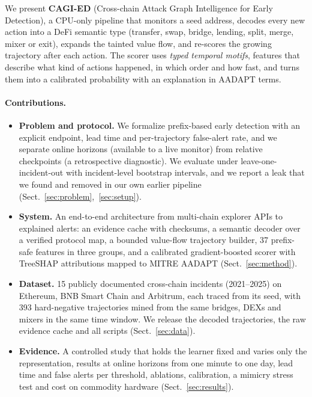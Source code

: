 We present \textbf{CAGI-ED} (Cross-chain Attack Graph Intelligence for Early Detection), a CPU-only pipeline that monitors a seed address, decodes every new action into a DeFi semantic type (transfer, swap, bridge, lending, split, merge, mixer or exit), expands the tainted value flow, and re-scores the growing trajectory after each action.
The scorer uses \emph{typed temporal motifs}, features that describe what kind of actions happened, in which order and how fast, and turns them into a calibrated probability with an explanation in AADAPT terms.

\paragraph{Contributions.}
\begin{itemize}
\item \textbf{Problem and protocol.} We formalize prefix-based early detection with an explicit endpoint, lead time and per-trajectory false-alert rate, and we separate online horizons (available to a live monitor) from relative checkpoints (a retrospective diagnostic). We evaluate under leave-one-incident-out with incident-level bootstrap intervals, and we report a leak that we found and removed in our own earlier pipeline (Sect.~\ref{sec:problem},~\ref{sec:setup}).
\item \textbf{System.} An end-to-end architecture from multi-chain explorer APIs to explained alerts: an evidence cache with checksums, a semantic decoder over a verified protocol map, a bounded value-flow trajectory builder, 37 prefix-safe features in three groups, and a calibrated gradient-boosted scorer with TreeSHAP attributions mapped to MITRE AADAPT (Sect.~\ref{sec:method}).
\item \textbf{Dataset.} 15 publicly documented cross-chain incidents (2021--2025) on Ethereum, BNB Smart Chain and Arbitrum, each traced from its seed, with 393 hard-negative trajectories mined from the same bridges, DEXs and mixers in the same time window. We release the decoded trajectories, the raw evidence cache and all scripts (Sect.~\ref{sec:data}).
\item \textbf{Evidence.} A controlled study that holds the learner fixed and varies only the representation, results at online horizons from one minute to one day, lead time and false alerts per threshold, ablations, calibration, a mimicry stress test and cost on commodity hardware (Sect.~\ref{sec:results}).
\end{itemize}
